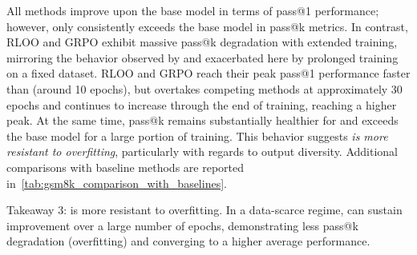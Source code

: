 \documentclass[10pt]{article} %
\begin{document}
\begin{table}
    \centering
    \vspace{-8pt}
    \caption{Performance comparison across methods on GSM8K.}
    \vspace{-7pt}
    \label{tab:gsm8k_comparison_with_baselines}
\end{table}

All methods improve upon the base model in terms of pass@1 performance; however, only \ours{} consistently exceeds the base model in pass@k metrics. In contrast, RLOO and GRPO exhibit massive pass@k degradation with extended training, mirroring the behavior observed by \citet{yue2025doesreinforcementlearningreally} and exacerbated here by prolonged training on a fixed dataset. RLOO and GRPO reach their peak pass@1 performance faster than \ours{} (around 10 epochs), but \ours{} overtakes competing methods at approximately 30 epochs and continues to increase through the end of training, reaching a higher peak. At the same time,  pass@k remains substantially healthier for \ours{} and exceeds the base model for a large portion of training.
This behavior suggests \emph{\ours{} is more resistant to overfitting}, particularly with regards to output diversity. Additional comparisons with baseline methods are reported in~\cref{tab:gsm8k_comparison_with_baselines}.

\begin{AIbox}{Takeaway 3: \ours{} is more resistant to overfitting.}
In a data-scarce regime, \ours{} can sustain improvement over a large number of epochs, demonstrating less pass@k degradation (overfitting) and converging to a higher average performance.
\end{AIbox}
\end{document}
